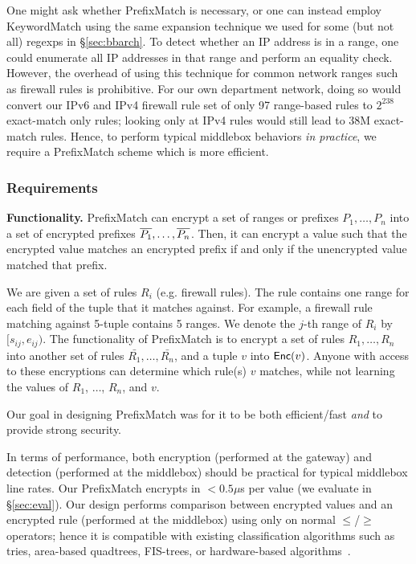 One might ask whether PrefixMatch is necessary, or one can instead employ KeywordMatch using the same expansion technique we used for some (but not all) regexps in \S\ref{sec:bbarch}. 
To detect whether an IP address is in a range, one could enumerate all IP addresses in that range and perform an equality check. However, the overhead of using this technique for common network ranges such as firewall rules is prohibitive.
For our own department network, doing so would convert our IPv6 and IPv4 firewall rule set of only 97 range-based rules to $2^{238}$ exact-match only rules; looking only at IPv4 rules would still lead to 38M exact-match rules.
Hence, to perform typical middlebox behaviors {\it in practice}, we require a PrefixMatch scheme which is more efficient.

\subsubsection{Requirements}


\textbf{Functionality.}
PrefixMatch can encrypt a set of ranges or prefixes $P_1, \dots, P_n$ into a set of encrypted prefixes $\overline{P_1}, \dots, \overline{P_n}$. Then, it can encrypt a value such that the encrypted value matches an encrypted prefix if and only if the unencrypted value matched that prefix.


We are given a set of rules $R_i$ (e.g. firewall rules). The rule contains one range for each field of the tuple that it matches against. For example, a firewall rule matching against 5-tuple contains 5 ranges. We denote the $j$-th range of $R_i$ by $[s_{ij}, e_{ij})$. The functionality of PrefixMatch is to encrypt a set of rules $R_1, \dots, R_n$ into another set of rules $\bar{R_1}, \dots, \bar{R_n}$, and a tuple $v$ into $\mathsf{Enc}(v)$. Anyone with access to these encryptions can determine which rule(s) $v$ matches,  while not learning the values of $R_1$, $\dots$, $R_n$, and $v$. 


Our goal in designing PrefixMatch was for it to be both efficient/fast {\em and} to provide strong security.

In terms of performance, both encryption (performed at the gateway) and detection (performed at the middlebox) should be practical for typical middlebox line rates.
Our PrefixMatch encrypts in $< 0.5\mu$s per value (we evaluate in \S\ref{sec:eval}).
Our design performs comparison between encrypted values and an encrypted rule (performed at the middlebox) using only on normal $\leq$/$\geq$ operators; hence it is compatible with existing classification algorithms such as tries, area-based quadtrees, FIS-trees, or hardware-based algorithms~\cite{packet_classif}.

